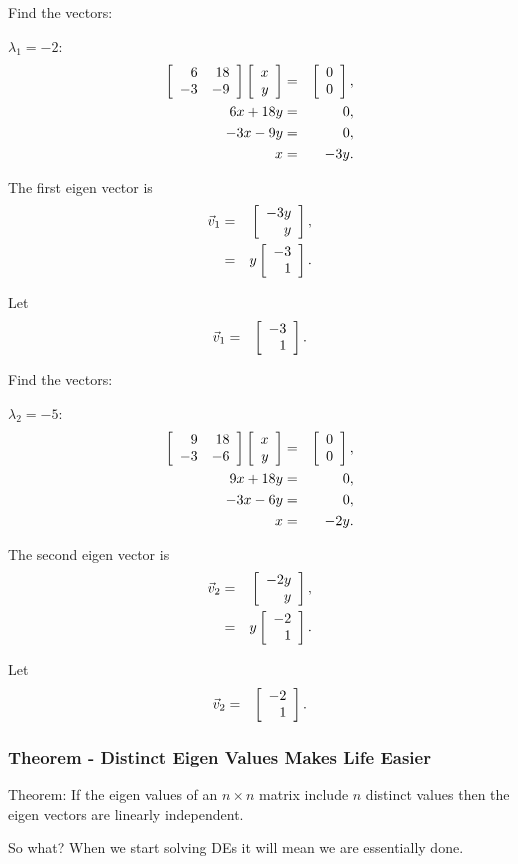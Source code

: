 \begin{frame}
  Find the vectors:

  $\lambda_1 = -2$:
  \begin{eqnarray*}
    \left[ \begin{array}{rr} 6 & 18 \\ -3 & -9 \end{array} \right] \left[ \begin{array}{r} x \\ y \end{array} \right] & = & \left[ \begin{array}{r} 0 \\ 0 \end{array} \right], \\
    6x + 18y & = & 0, \\
    -3x - 9y & = & 0, \\
    x & = & -3y.
  \end{eqnarray*}

  The first eigen vector is 
  \begin{eqnarray*}
    \vec{v}_1 & = & \left[ \begin{array}{r} -3y \\ y \end{array} \right], \\
    & = & y \left[ \begin{array}{r} -3 \\ 1 \end{array} \right].
  \end{eqnarray*}

  Let
  \begin{eqnarray*}
    \vec{v}_1 & = & \left[ \begin{array}{r} -3 \\ 1 \end{array} \right].
  \end{eqnarray*}

\end{frame}

\begin{frame}
  Find the vectors:

  $\lambda_2 = -5$:
  \begin{eqnarray*}
    \left[ \begin{array}{rr} 9 & 18 \\ -3 & -6 \end{array} \right] \left[ \begin{array}{r} x \\ y \end{array} \right] & = & \left[ \begin{array}{r} 0 \\ 0 \end{array} \right], \\
    9x + 18y & = & 0, \\
    -3x - 6y & = & 0, \\
    x & = & -2 y.
  \end{eqnarray*}

  The second eigen vector is 
  \begin{eqnarray*}
    \vec{v}_2 & = & \left[ \begin{array}{r} -2y \\ y \end{array} \right], \\
    & = & y \left[ \begin{array}{r} -2 \\ 1 \end{array} \right].
  \end{eqnarray*}

  Let
  \begin{eqnarray*}
    \vec{v}_2 & = & \left[ \begin{array}{r} -2 \\ 1 \end{array} \right].
  \end{eqnarray*}

\end{frame}



\begin{frame}
  \frametitle{Theorem - Distinct Eigen Values Makes Life Easier}

  Theorem: If the eigen values of an $n\times n$ matrix include $n$
  distinct values then the eigen vectors are linearly independent.

  \vfill

  {
    So what? When we start solving DEs it will mean we are essentially
    done. 
  }

  \vfill

\end{frame}



